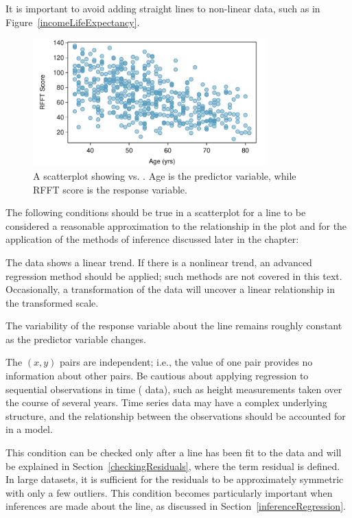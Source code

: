 It is important to avoid adding straight lines to non-linear data, such as in  Figure~\ref{incomeLifeExpectancy}.

\begin{figure}[h]
	\centering
	\includegraphics[width=0.8\textwidth]
	{ch_09a_simple_linear_regression_oi_biostat/figures/prevendAgeRFFTPlot/prevendAgeRFFTPlot}
	\caption{A scatterplot showing  vs. . Age is the predictor variable, while RFFT score is the response variable.}
	\label{prevendAgeRFFT}
\end{figure}

\textD{\newpage}

The following conditions should be true in a scatterplot for a line to be considered a reasonable approximation to the relationship in the plot and for the application of the methods of inference discussed later in the chapter:




\begin{description}
\setlength{\itemsep}{0mm}
\item[1 Linearity.] The data shows a linear trend. If there is a nonlinear trend, an advanced regression method should be applied; such methods are not covered in this text.  Occasionally, a transformation of the data will uncover a linear relationship in the transformed scale.
\item[2 Constant variability.] The variability of the response variable about the line remains roughly constant as the predictor variable changes.
\item[3 Independent observations.]  The $(x,y)$ pairs are independent; i.e., the value of one pair provides no information about other pairs. Be cautious about applying regression to sequential observations in time ( data), such as height measurements taken over the course of several years. Time series data may have a complex underlying structure, and the relationship between the observations should be accounted for in a model. 
\item[4 Residuals that are approximately normally distributed.] This condition can be checked only after a line has been fit to the data and will be explained in Section~\ref{checkingResiduals}, where the term residual is defined. In large datasets, it is sufficient for the residuals to be approximately symmetric with only a few outliers. This condition becomes particularly important when inferences are made about the line, as discussed in Section~\ref{inferenceRegression}.  
\end{description}

